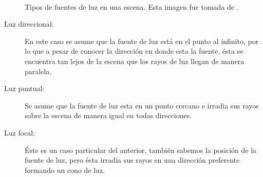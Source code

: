 \begin{figure}[htp]
  \begin{center}
     \\
  \end{center}
  \caption[Diferentes tipos de luz en una escena]{Tipos de fuentes de luz en una escena. Esta imagen fue tomada de \cite{libroCV}.}
  \label{fig:tiposLuz}
\end{figure}

\begin{description}
 \item[Luz direccional:] En este caso se asume que la fuente de luz está en el punto al infinito, por lo que a pesar de conocer la dirección en donde esta la fuente, ésta se encuentra tan lejos de la escena que los rayos de luz llegan de manera paralela.
\item[Luz puntual:] Se asume que la fuente de luz esta en un punto cercano e irradia sus rayos sobre la escena de manera igual en todas direcciones.
\item[Luz focal:] Éste es un caso particular del anterior, también sabemos la posición de la fuente de luz, pero ésta irradia sus rayos en una dirección preferente formando un cono de luz.
 \end{description}


